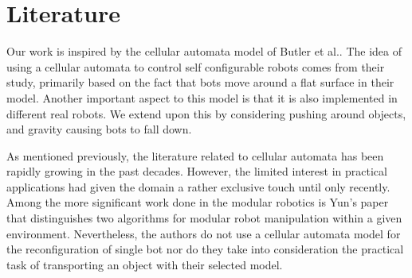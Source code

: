 \section{Literature}
\label{sec:lit}

Our work is inspired by the cellular automata model of Butler et al.\cite{butler02}. The idea of using a cellular automata to control self configurable robots comes from their study, primarily based on the fact that bots move around a flat surface in their model. Another important aspect to this model is that it is also implemented in different real robots. We extend upon this by considering pushing around objects, and gravity causing bots to fall down.

As mentioned previously, the literature related to cellular automata has been rapidly growing in the past decades. However, the limited interest in practical applications had given the domain a rather exclusive touch until only recently. Among the more significant work done in the modular robotics is Yun's paper \cite{Yun:2011:OSA:2036628.2036638} that distinguishes two algorithms for modular robot manipulation within a given environment. Nevertheless, the authors do not use a cellular automata model for the reconfiguration of single bot nor do they take into consideration the practical task of transporting an object with their selected model.
